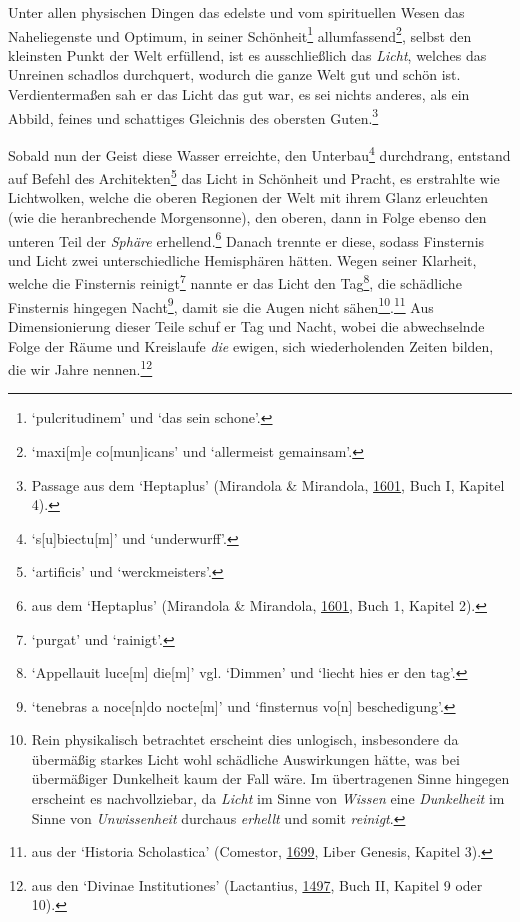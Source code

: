 \documentclass[
]{article}
\begin{document}
Unter allen physischen Dingen das edelste und vom spirituellen Wesen das
Naheliegenste und Optimum, in seiner Schönheit\footnote{`pulcritudinem'
  und `das sein schone'.} allumfassend\footnote{`maxi{[}m{]}e
  co{[}mun{]}icans' und `allermeist gemainsam'.}, selbst den kleinsten
Punkt der Welt erfüllend, ist es ausschließlich das \emph{Licht},
welches das Unreinen schadlos durchquert, wodurch die ganze Welt gut und
schön ist. Verdientermaßen sah er das Licht das gut war, es sei nichts
anderes, als ein Abbild, feines und schattiges Gleichnis des obersten
Guten.\footnote{Passage aus dem `Heptaplus' (Mirandola \& Mirandola,
  \href{https://doi.org/10.3931/e-rara-61217}{1601}, Buch I, Kapitel 4).}

Sobald nun der Geist diese Wasser erreichte, den Unterbau\footnote{`s{[}u{]}biectu{[}m{]}'
  und `underwurff'.} durchdrang, entstand auf Befehl des
Architekten\footnote{`artificis' und `werckmeisters'.} das Licht in
Schönheit und Pracht, es erstrahlte wie Lichtwolken, welche die oberen
Regionen der Welt mit ihrem Glanz erleuchten (wie die heranbrechende
Morgensonne), den oberen, dann in Folge ebenso den unteren Teil der
\emph{Sphäre} erhellend.\footnote{aus dem `Heptaplus' (Mirandola \&
  Mirandola, \href{https://doi.org/10.3931/e-rara-61217}{1601}, Buch 1,
  Kapitel 2).} Danach trennte er diese, sodass Finsternis und Licht zwei
unterschiedliche Hemisphären hätten. Wegen seiner Klarheit, welche die
Finsternis reinigt\footnote{`purgat' und `rainigt'.} nannte er das Licht
den Tag\footnote{`Appellauit luce{[}m{]} die{[}m{]}' vgl. `Dimmen' und
  `liecht hies er den tag'.}, die schädliche Finsternis hingegen
Nacht\footnote{`tenebras a noce{[}n{]}do nocte{[}m{]}' und `finsternus
  vo{[}n{]} beschedigung'.}, damit sie die Augen nicht
sähen\footnote{Rein physikalisch betrachtet erscheint dies unlogisch,
  insbesondere da übermäßig starkes Licht wohl schädliche Auswirkungen
  hätte, was bei übermäßiger Dunkelheit kaum der Fall wäre. Im
  übertragenen Sinne hingegen erscheint es nachvollziebar, da
  \emph{Licht} im Sinne von \emph{Wissen} eine \emph{Dunkelheit} im
  Sinne von \emph{Unwissenheit} durchaus \emph{erhellt} und somit
  \emph{reinigt}.}.\footnote{aus der `Historia Scholastica' (Comestor,
  \href{https://books.google.com/books?id=fKkLGynZVoYC}{1699}, Liber
  Genesis, Kapitel 3).} Aus Dimensionierung dieser Teile schuf er Tag
und Nacht, wobei die abwechselnde Folge der Räume und Kreislaufe
\emph{die} ewigen, sich wiederholenden Zeiten bilden, die wir Jahre
nennen.\footnote{aus den `Divinae Institutiones' (Lactantius,
  \href{https://books.google.com/books?id=qGsnghsi3uUC}{1497}, Buch II,
  Kapitel 9 oder 10).}
\end{document}
